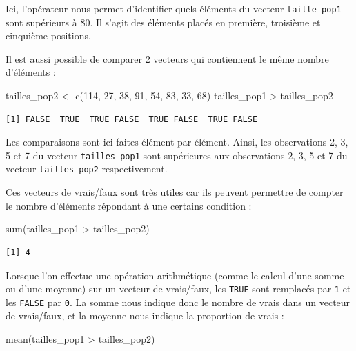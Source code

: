 \documentclass[
  a4paper,
  DIV=11,
  numbers=noendperiod,
  oneside]{scrreprt}
\newenvironment{Shaded}{}{}
\newcommand{\DecValTok}[1]{\textcolor[rgb]{0.00,0.36,0.77}{#1}}
\newcommand{\FunctionTok}[1]{\textcolor[rgb]{0.44,0.26,0.76}{#1}}
\newcommand{\NormalTok}[1]{\textcolor[rgb]{0.14,0.16,0.18}{#1}}
\newcommand{\OtherTok}[1]{\textcolor[rgb]{0.44,0.26,0.76}{#1}}
\newcommand{\SpecialCharTok}[1]{\textcolor[rgb]{0.00,0.36,0.77}{#1}}
\begin{document}
Ici, l'opérateur nous permet d'identifier quels éléments du vecteur
\texttt{taille\_pop1} sont supérieurs à 80. Il s'agit des éléments
placés en première, troisième et cinquième positions.

Il est aussi possible de comparer 2 vecteurs qui contiennent le même
nombre d'éléments :

\begin{Shaded}
\begin{Highlighting}[]
\NormalTok{tailles\_pop2 }\OtherTok{\textless{}{-}} \FunctionTok{c}\NormalTok{(}\DecValTok{114}\NormalTok{, }\DecValTok{27}\NormalTok{, }\DecValTok{38}\NormalTok{, }\DecValTok{91}\NormalTok{, }\DecValTok{54}\NormalTok{, }\DecValTok{83}\NormalTok{, }\DecValTok{33}\NormalTok{, }\DecValTok{68}\NormalTok{)}
\NormalTok{tailles\_pop1 }\SpecialCharTok{\textgreater{}}\NormalTok{ tailles\_pop2}
\end{Highlighting}
\end{Shaded}

\begin{verbatim}
[1] FALSE  TRUE  TRUE FALSE  TRUE FALSE  TRUE FALSE
\end{verbatim}

Les comparaisons sont ici faites élément par élément. Ainsi, les
observations 2, 3, 5 et 7 du vecteur \texttt{tailles\_pop1} sont
supérieures aux observations 2, 3, 5 et 7 du vecteur
\texttt{tailles\_pop2} respectivement.

Ces vecteurs de vrais/faux sont très utiles car ils peuvent permettre de
compter le nombre d'éléments répondant à une certains condition :

\begin{Shaded}
\begin{Highlighting}[]
\FunctionTok{sum}\NormalTok{(tailles\_pop1 }\SpecialCharTok{\textgreater{}}\NormalTok{ tailles\_pop2)}
\end{Highlighting}
\end{Shaded}

\begin{verbatim}
[1] 4
\end{verbatim}

Lorsque l'on effectue une opération arithmétique (comme le calcul d'une
somme ou d'une moyenne) sur un vecteur de vrais/faux, les \texttt{TRUE}
sont remplacés par \texttt{1} et les \texttt{FALSE} par \texttt{0}. La
somme nous indique donc le nombre de vrais dans un vecteur de
vrais/faux, et la moyenne nous indique la proportion de vrais :

\begin{Shaded}
\begin{Highlighting}[]
\FunctionTok{mean}\NormalTok{(tailles\_pop1 }\SpecialCharTok{\textgreater{}}\NormalTok{ tailles\_pop2)}
\end{Highlighting}
\end{Shaded}
\end{document}
